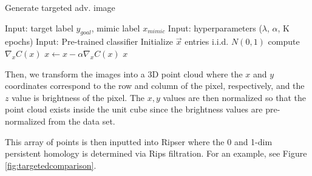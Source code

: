 \documentclass[twoside,twocolumn]{article}
\begin{document}
\begin{algorithm}
\caption{Generate targeted adv. image}
\begin{algorithmic}
\STATE Input: target label $y_{goal}$, mimic label $x_{mimic}$
\STATE Input: hyperparameters ($\lambda$, $\alpha$, K epochs)
\STATE Input: Pre-trained classifier
\STATE Initialize $\vec{x}$ entries i.i.d. $N(0,1)$
    \STATE compute $\nabla_x C(x)$
    \STATE $x \gets x - \alpha \nabla_x C(x)$
\ENDFOR
\RETURN $x$
\end{algorithmic}
\end{algorithm}

Then, we transform the images into a 3D point cloud where the $x$ and $y$ coordinates correspond to the row and column of the pixel, respectively, and the $z$ value is brightness of the pixel. The $x,y$ values are then normalized so that the point cloud exists inside the unit cube since the brightness values are pre-normalized from the data set. 

This array of points is then inputted into Ripser where the 0 and 1-dim persistent homology is determined via Rips filtration. For an example, see Figure \ref{fig:targetedcomparison}.

\end{document}
